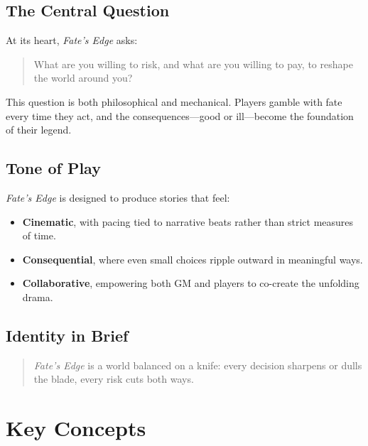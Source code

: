 \documentclass[12pt]{book}
\begin{document}
\section{The Central Question}
At its heart, \textit{Fate’s Edge} asks:  

\begin{quote}
\centering
What are you willing to risk, and what are you willing to pay, to reshape the world around you?
\end{quote}

This question is both philosophical and mechanical. Players gamble with fate every time they act, and the consequences—good or ill—become the foundation of their legend.  

\section{Tone of Play}
\textit{Fate’s Edge} is designed to produce stories that feel:  
\begin{itemize}
  \item \textbf{Cinematic}, with pacing tied to narrative beats rather than strict measures of time.  
  \item \textbf{Consequential}, where even small choices ripple outward in meaningful ways.  
  \item \textbf{Collaborative}, empowering both GM and players to co-create the unfolding drama.  
\end{itemize}

\section{Identity in Brief}
\begin{quote}
\textit{Fate’s Edge} is a world balanced on a knife:  
every decision sharpens or dulls the blade,  
every risk cuts both ways.  
\end{quote}

\chapter{Key Concepts}
\end{document}
